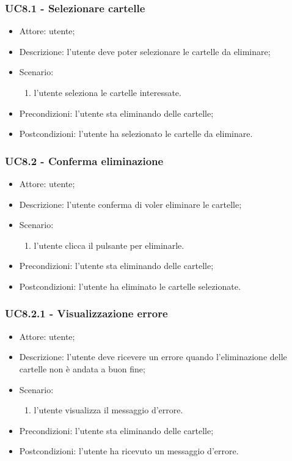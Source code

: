     \subsubsection{UC8.1 - Selezionare cartelle}
    \begin{itemize}
        \item Attore: utente;
        \item Descrizione: l'utente deve poter selezionare le cartelle da eliminare;
        \item Scenario:
        \begin{enumerate}
        \item l'utente seleziona le cartelle interessate.
        \end{enumerate}
        \item Precondizioni: l'utente sta eliminando delle cartelle;
        \item Postcondizioni: l'utente ha selezionato le cartelle da eliminare.
    \end{itemize}

    \subsubsection{UC8.2 - Conferma eliminazione}
    \begin{itemize}
        \item Attore: utente;
        \item Descrizione: l'utente conferma di voler eliminare le cartelle;
        \item Scenario:
        \begin{enumerate}
        \item l'utente clicca il pulsante per eliminarle.
        \end{enumerate}
        \item Precondizioni: l'utente sta eliminando delle cartelle;
        \item Postcondizioni: l'utente ha eliminato le cartelle selezionate.
    \end{itemize}

    \subsubsection{UC8.2.1 - Visualizzazione errore }
    \begin{itemize}
        \item Attore: utente;
        \item Descrizione: l'utente deve ricevere un errore quando l'eliminazione delle cartelle non è andata a buon fine;
        \item Scenario:
        \begin{enumerate}
        \item l'utente visualizza il messaggio d'errore.
        \end{enumerate}   
        \item Precondizioni: l'utente sta eliminando delle cartelle;
        \item Postcondizioni: l'utente ha ricevuto un messaggio d'errore.
    \end{itemize}

